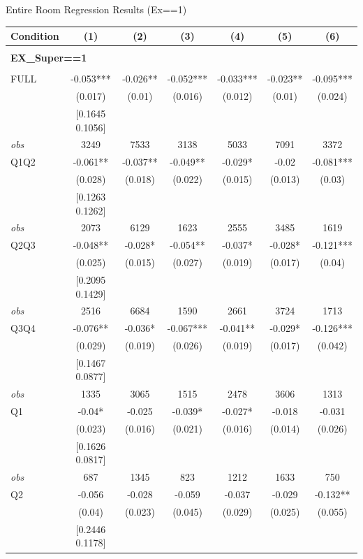 \begin{table}[]
\TABLE
{Entire Room Regression Results (Ex==1) \label{result_detail1}}{\begin{tabular}{lcccccc}
\hline
Condition & (1) & (2) & (3) & (4) & (5) & (6) \\ \hline
\\ 
\multicolumn{5}{l}{\textbf{EX\_Super==1}} \\ 
\\ 
FULL & -0.053*** & -0.026** & -0.052*** & -0.033*** & -0.023** & -0.095*** \\ 
&(0.017)&(0.01) & (0.016)&(0.012)&(0.01)&(0.024)\\ 
& [0.1645 0.1056] & & & & & \\ 
\textit{obs} & 3249 & 7533 & 3138 & 5033 & 7091 & 3372 \\ 
Q1Q2 & -0.061** & -0.037** & -0.049** & -0.029* & -0.02 & -0.081*** \\ 
&(0.028)&(0.018) & (0.022)&(0.015)&(0.013)&(0.03)\\ 
& [0.1263 0.1262] & & & & & \\ 
\textit{obs} & 2073 & 6129 & 1623 & 2555 & 3485 & 1619 \\ 
Q2Q3 & -0.048** & -0.028* & -0.054** & -0.037* & -0.028* & -0.121*** \\ 
&(0.025)&(0.015) & (0.027)&(0.019)&(0.017)&(0.04)\\ 
& [0.2095 0.1429] & & & & & \\ 
\textit{obs} & 2516 & 6684 & 1590 & 2661 & 3724 & 1713 \\ 
Q3Q4 & -0.076** & -0.036* & -0.067*** & -0.041** & -0.029* & -0.126*** \\ 
&(0.029)&(0.019) & (0.026)&(0.019)&(0.017)&(0.042)\\ 
& [0.1467 0.0877] & & & & & \\ 
\textit{obs} & 1335 & 3065 & 1515 & 2478 & 3606 & 1313 \\ 
Q1 & -0.04* & -0.025 & -0.039* & -0.027* & -0.018 & -0.031 \\ 
&(0.023)&(0.016) & (0.021)&(0.016)&(0.014)&(0.026)\\ 
& [0.1626 0.0817] & & & & & \\ 
\textit{obs} & 687 & 1345 & 823 & 1212 & 1633 & 750 \\ 
Q2 & -0.056 & -0.028 & -0.059 & -0.037 & -0.029 & -0.132** \\ 
&(0.04)&(0.023) & (0.045)&(0.029)&(0.025)&(0.055)\\ 
& [0.2446 0.1178] & & & & & \\ 

\end{tabular}}
\end{table}

